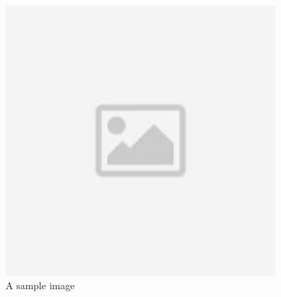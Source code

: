 \begin{figure}[h]
  \centering
  \includegraphics[width=0.9\textwidth]{assets/placeholder.jpg}
  \caption{A sample image}
  \label{fig:1} %
\end{figure}
